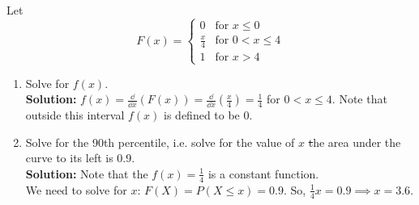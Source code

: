 \begin{example}
    Let
    \[
        F(x) = 
        \begin{cases} 
        0 & \text{for } x \leq 0 \\
        \frac{x}{4} & \text{for } 0 < x \leq 4 \\
        1 & \text{for } x > 4 
        \end{cases}
    \]
    \begin{enumerate}[label=(\alph*)]
        \item Solve for $f(x)$. \\
        \textbf{Solution:} $f(x) = \frac{\dd}{\dd{x}} \left( F(x) \right) = \frac{\dd}{\dd{x}} \left( \frac{x}{4} \right) = \frac{1}{4}$ for $0 < x \leq 4$. Note that outside this interval $f(x)$ is defined to be 0.
        \item Solve for the 90th percentile, i.e. solve for the value of $x$ \st the area under the curve to its left is 0.9. \\
        \textbf{Solution:} Note that the $f(x) = \frac{1}{4}$ is a constant function. \\
        We need to solve for $x$: $F(X) = P(X \leq x) = 0.9$. So, $\frac{1}{4} x = 0.9 \implies x = 3.6$.
    \end{enumerate}
\end{example}

\pagebreak

